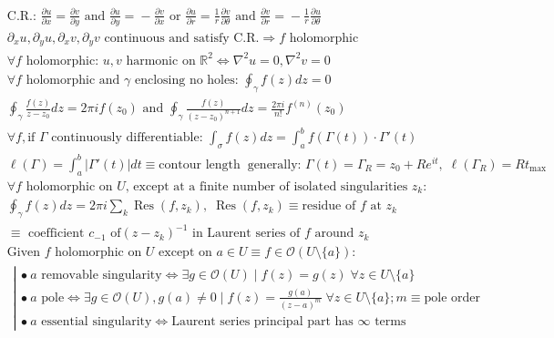 \begin{align*}
&\text{C.R.: }\frac{\partial u}{\partial x}\!=\!\frac{\partial v}{\partial y}\text{ and }\frac{\partial u}{\partial y}\!=\!-\frac{\partial v}{\partial x}\text{ or }\frac{\partial u}{\partial r}\!=\!\frac{1}{r}\frac{\partial v}{\partial\theta}\text{ and }\frac{\partial v}{\partial r}\!=\!-\frac{1}{r}\frac{\partial u}{\partial\theta} \\
&\partial_x u,\partial_y u,\partial_x v,\partial_y v\text{ continuous and satisfy C.R.}\Rightarrow f\text{ holomorphic} \\
&\forall f\text{ holomorphic: }u,v\text{ harmonic on $\mathbb{R}^2$}\Leftrightarrow\nabla^2u\!=\!0,\nabla^2v\!=\!0 \\
&\forall f\text{ holomorphic and $\gamma$ enclosing no holes: }\oint_\gamma\!f(z)dz\!=\!0 \\
&\oint_\gamma\!\frac{f(z)}{z\!-\!z_0}dz\!=\!2\pi if(z_0)\text{ and }\oint_\gamma\!\frac{f(z)}{(z\!-\!z_0)^{n+1}}dz\!=\!\frac{2\pi i}{n!}f^{(n)}(z_0) \\
&\forall f,\text{if $\Gamma$ continuously differentiable: }\int_\sigma\!f(z)dz\!\!=\!\!\int_a^b\!f(\Gamma(t))\cdot\Gamma'(t) \\
&\ell(\Gamma)\!=\!\int_a^b\!|\Gamma'(t)|dt\!\equiv\!\text{contour length}\;\;\text{generally: }\!\Gamma(t)\!=\!\Gamma_R\!=\!z_0\!+\!Re^{it},\;\ell(\Gamma_R)\!=\!Rt_{\text{max}} \\
&\text{$\forall f$ holomorphic on $U$, except at a finite number of isolated singularities $z_k$:} \\
&\oint_\gamma\!f(z)dz\!=\!2\pi i\sum_k\operatorname{Res}(f,z_k),\;\operatorname{Res}(f,z_k)\!\equiv\!\text{residue of $f$ at }z_k \\
&\equiv \text{ coefficient } c_{-1} \text{ of} (z-z_k)^{-1} \text{ in Laurent series of $f$ around }z_k \\
&\text{Given $f$ holomorphic on $U$ except on $a \in U \equiv f \in\mathcal{O}(U\setminus\{a\})$:} \\
&\hspace{5pt}\left|\!\!\!
\begin{array}{l}
\bullet\ a\text{ removable singularity}\Leftrightarrow\exists g\in\mathcal{O}(U)\mid f(z)\!=\!g(z)\;\forall z\in U\setminus\{a\} \\
\bullet\ a\text{ pole}\Leftrightarrow\exists g\in\mathcal{O}(U),g(a)\!\neq\!0\mid f(z)\!=\!\frac{g(a)}{(z\!-\!a)^m}\;\forall z\in U\setminus\{a\}; m\equiv \text{pole order}\\
\bullet\ a\text{ essential singularity}\Leftrightarrow\text{Laurent series principal part has $\infty$ terms}

\end{array}
\end{align*}
